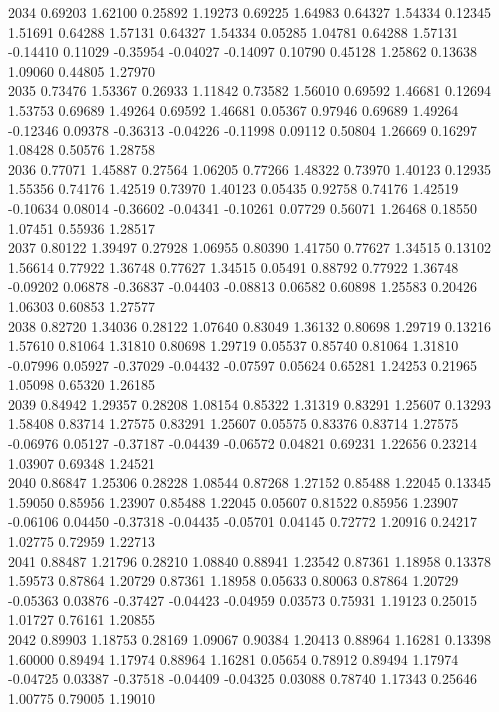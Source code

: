 {2034 0.69203 1.62100 0.25892 1.19273 0.69225 1.64983 0.64327 1.54334 0.12345 1.51691 0.64288 1.57131 0.64327 1.54334 0.05285 1.04781 0.64288 1.57131 -0.14410 0.11029 -0.35954 -0.04027 -0.14097 0.10790 0.45128 1.25862 0.13638 1.09060 0.44805 1.27970 \\
2035 0.73476 1.53367 0.26933 1.11842 0.73582 1.56010 0.69592 1.46681 0.12694 1.53753 0.69689 1.49264 0.69592 1.46681 0.05367 0.97946 0.69689 1.49264 -0.12346 0.09378 -0.36313 -0.04226 -0.11998 0.09112 0.50804 1.26669 0.16297 1.08428 0.50576 1.28758 \\
2036 0.77071 1.45887 0.27564 1.06205 0.77266 1.48322 0.73970 1.40123 0.12935 1.55356 0.74176 1.42519 0.73970 1.40123 0.05435 0.92758 0.74176 1.42519 -0.10634 0.08014 -0.36602 -0.04341 -0.10261 0.07729 0.56071 1.26468 0.18550 1.07451 0.55936 1.28517 \\
2037 0.80122 1.39497 0.27928 1.06955 0.80390 1.41750 0.77627 1.34515 0.13102 1.56614 0.77922 1.36748 0.77627 1.34515 0.05491 0.88792 0.77922 1.36748 -0.09202 0.06878 -0.36837 -0.04403 -0.08813 0.06582 0.60898 1.25583 0.20426 1.06303 0.60853 1.27577 \\
2038 0.82720 1.34036 0.28122 1.07640 0.83049 1.36132 0.80698 1.29719 0.13216 1.57610 0.81064 1.31810 0.80698 1.29719 0.05537 0.85740 0.81064 1.31810 -0.07996 0.05927 -0.37029 -0.04432 -0.07597 0.05624 0.65281 1.24253 0.21965 1.05098 0.65320 1.26185 \\
2039 0.84942 1.29357 0.28208 1.08154 0.85322 1.31319 0.83291 1.25607 0.13293 1.58408 0.83714 1.27575 0.83291 1.25607 0.05575 0.83376 0.83714 1.27575 -0.06976 0.05127 -0.37187 -0.04439 -0.06572 0.04821 0.69231 1.22656 0.23214 1.03907 0.69348 1.24521 \\
2040 0.86847 1.25306 0.28228 1.08544 0.87268 1.27152 0.85488 1.22045 0.13345 1.59050 0.85956 1.23907 0.85488 1.22045 0.05607 0.81522 0.85956 1.23907 -0.06106 0.04450 -0.37318 -0.04435 -0.05701 0.04145 0.72772 1.20916 0.24217 1.02775 0.72959 1.22713 \\
2041 0.88487 1.21796 0.28210 1.08840 0.88941 1.23542 0.87361 1.18958 0.13378 1.59573 0.87864 1.20729 0.87361 1.18958 0.05633 0.80063 0.87864 1.20729 -0.05363 0.03876 -0.37427 -0.04423 -0.04959 0.03573 0.75931 1.19123 0.25015 1.01727 0.76161 1.20855 \\
2042 0.89903 1.18753 0.28169 1.09067 0.90384 1.20413 0.88964 1.16281 0.13398 1.60000 0.89494 1.17974 0.88964 1.16281 0.05654 0.78912 0.89494 1.17974 -0.04725 0.03387 -0.37518 -0.04409 -0.04325 0.03088 0.78740 1.17343 0.25646 1.00775 0.79005 1.19010 \\
}
